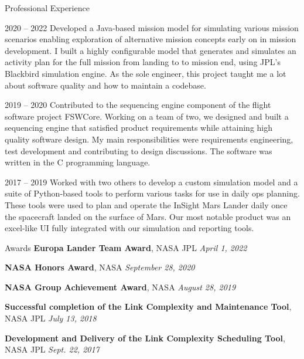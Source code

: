 \documentclass{resume} %
\begin{document}
\begin{rSection}{Professional Experience}{}
{        
        {}
        {2020 -- 2022}
        {
          Developed a Java-based mission model for simulating various mission scenarios enabling exploration of alternative mission concepts early on in mission development. I built a highly configurable model that generates and simulates an activity plan for the full mission from landing to to mission end, using JPL's Blackbird simulation engine. As the sole engineer, this project taught me a lot about software quality and how to maintain a codebase.
        }

        {}
        {2019 -- 2020}
        {
          Contributed to the sequencing engine component of the flight software project FSWCore. Working on a team of two, we designed and built a sequencing engine that satisfied product requirements while attaining high quality software design. My main responsibilities were requirements engineering, test development and contributing to design discussions. The software was written in the C programming language.
        }

        {}
        {2017 -- 2019}
        {
          Worked with two others to develop a custom simulation model and a suite of Python-based tools to perform various tasks for use in daily ops planning. These tools were used to plan and operate the InSight Mars Lander daily once the spacecraft landed on the surface of Mars. Our most notable product was an excel-like UI fully integrated with our simulation and reporting tools.
        }

    }
\end{rSection}

\newpage

\begin{rSection}{Awards}{}
  \textbf{Europa Lander Team Award}, NASA JPL
  \hfill
  \emph{April 1, 2022}

  \textbf{NASA Honors Award}, NASA
  \hfill
  \emph{September 28, 2020}

  \textbf{NASA Group Achievement Award}, NASA
  \hfill
  \emph{August 28, 2019}

  \textbf{Successful completion of the Link Complexity and Maintenance Tool}, NASA JPL
  \hfill
  \emph{July 13, 2018}

  \textbf{Development and Delivery of the Link Complexity Scheduling Tool}, NASA JPL
  \hfill
  \emph{Sept. 22, 2017}

\end{rSection}
\end{document}
